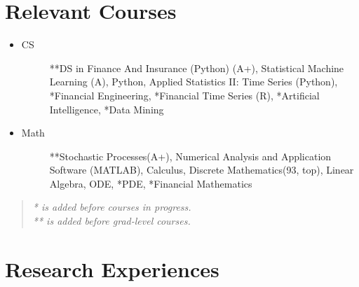 \documentclass[a4paper]{article}
\begin{document}
\section{Relevant Courses}
\begin{itemize}
    
    \item\begin{description}
        \item[CS] **DS in Finance And Insurance (Python) (A+), Statistical Machine Learning (A), Python, Applied Statistics II: Time Series (Python), *Financial Engineering, *\hypertarget{FinTS}{Financial Time Series} (R), *Artificial Intelligence, *Data Mining
    \end{description}
    
    \item\begin{description}
        \item[Math] **Stochastic Processes(A+), Numerical Analysis and Application Software (MATLAB), Calculus, Discrete Mathematics(93, top), Linear Algebra, ODE, *PDE, *Financial Mathematics
    \end{description}
\end{itemize} 
\vspace{0pt}
\begin{quote}
    \itshape
    * is added before courses in progress.\\
    ** is added before grad-level courses.
\end{quote}

\section{Research Experiences}  %
\end{document}
